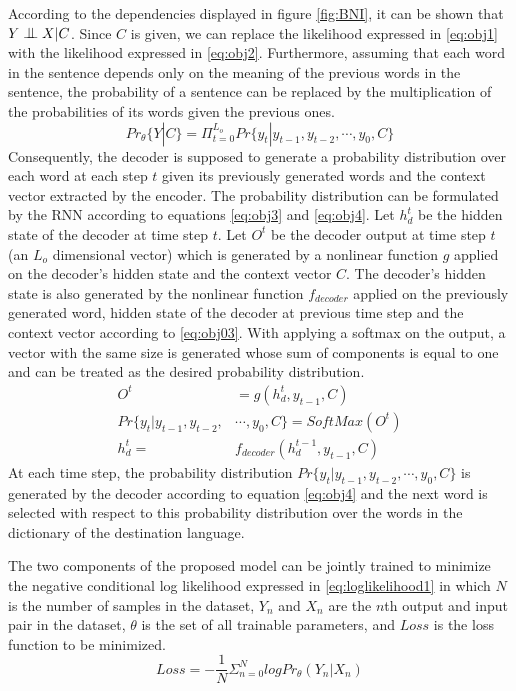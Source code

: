 \documentclass[preprint, 10pt]{elsarticle}
\newcommand{\bigCI}{\mathrel{\text{\scalebox{1.07}{$\perp\mkern-10mu\perp$}}}}
\begin{document}
		 According to the dependencies displayed in figure \ref{fig:BNI}, it can be shown that $Y  \bigCI X | C$. Since $C$ is given, we can replace the likelihood expressed in \eqref{eq:obj1} with the likelihood expressed in \eqref{eq:obj2}. Furthermore, assuming that each word in the sentence depends only on the meaning of the previous words in the sentence, the probability of a sentence can be replaced by the multiplication of the probabilities of its words given the previous ones.
		\begin{equation}
			Pr_\theta\{Y | C\} = \Pi_{t=0}^{L_o} Pr\{y_t| y_{t-1}, y_{t-2}, \cdots, y_0, C\}
			\label{eq:obj2}
		\end{equation}
		Consequently, the decoder is supposed to generate a probability distribution over each word at each step $t$ given its previously generated words and the context vector extracted by the encoder. The probability distribution can be formulated by the RNN according to equations \eqref{eq:obj3} and \eqref{eq:obj4}. Let $h_d^t$ be the hidden state of the decoder at time step $t$. Let $O^t$ be the decoder output at time step $t$ (an $L_o$ dimensional vector) which is generated by a nonlinear function $g$ applied on the decoder's hidden state and the context vector $C$. The decoder's hidden state is also generated by the nonlinear function $f_{decoder}$ applied on the previously generated word, hidden state of the decoder at previous time step and the context vector according to \eqref{eq:obj03}. With applying a softmax on the output, a vector with the same size is generated whose sum of components is equal to one and can be treated as the desired probability distribution.
		\begin{align}
			O^t &= g(h_d^t, y_{t-1}, C) 			\label{eq:obj3}\\
			Pr\{y_t| y_{t-1}, y_{t-2}, &\cdots, y_0, C\} = SoftMax(O^t)
			\label{eq:obj4}\\
			h_d^t = &f_{decoder}(h_d^{t-1}, y_{t-1}, C) \label{eq:obj03} 
		\end{align}
		At each time step, the probability distribution $Pr\{y_t| y_{t-1}, y_{t-2}, \cdots, y_0, C\}$ is generated by the decoder according to equation \eqref{eq:obj4} and the next word is selected with respect to this probability distribution over the words in the dictionary of the destination language.
		
		The two components of the proposed model can be jointly trained to minimize the negative conditional log likelihood expressed in \eqref{eq:loglikelihood1} in which $N$ is the number of samples in the dataset, $Y_n$ and $X_n$ are the $n$th output and input pair in the dataset, $\theta$ is the set of all trainable parameters, and $Loss$ is the loss function to be minimized.
		\begin{equation}
			Loss = -\frac{1}{N} \Sigma_{n=0}^N log Pr_\theta(Y_n | X_n)
			\label{eq:loglikelihood1}
		\end{equation}
		
\end{document}

